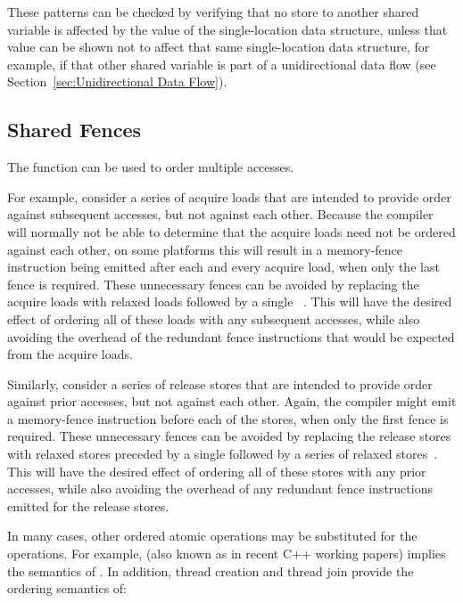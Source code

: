 \documentclass[10]{article}
\begin{document}
These patterns can be checked by verifying that no store to another shared
variable is affected by the value of the single-location data structure,
unless that value can be shown not to affect that same single-location
data structure, for example, if that other shared variable is part of
a unidirectional data flow
(see Section~\ref{sec:Unidirectional Data Flow}).

\subsection{Shared Fences}
\label{sec:Shared Fences}

The  function can be used to order multiple
accesses.

For example, consider a series of acquire loads that are intended to provide
order against subsequent accesses, but not against each other.
Because the compiler will normally not be able to determine that the
acquire loads need not be ordered against each other, on some platforms
this will result in a memory-fence instruction being emitted after each
and every acquire load, when only the last fence is required.
These unnecessary fences can be avoided by replacing the acquire
loads with relaxed loads followed by a single
~\cite[Section 4.1]{RaulSilvera2007WeakMemoryModel}.
This will have the desired effect of ordering all of these loads with any
subsequent accesses, while also avoiding the overhead of the redundant
fence instructions that would be expected from the acquire loads.

Similarly, consider a series of release stores that are intended to provide
order against prior accesses, but not against each other.
Again, the compiler might emit a memory-fence instruction before
each of the stores, when only the first fence is required.
These unnecessary fences can be avoided by replacing the release
stores with relaxed stores preceded by a single
 followed by
a series of relaxed stores~\cite[Section 4.2]{RaulSilvera2007WeakMemoryModel}.
This will have the desired effect of ordering all of these stores with any
prior accesses, while also avoiding the overhead of any redundant
fence instructions emitted for the release stores.

In many cases, other ordered atomic operations may be substituted for
the  operations.
For example, 
(also known as  in recent C++ working papers) implies
the semantics of .
In addition, thread creation and thread join provide the ordering
semantics of:
\end{document}
